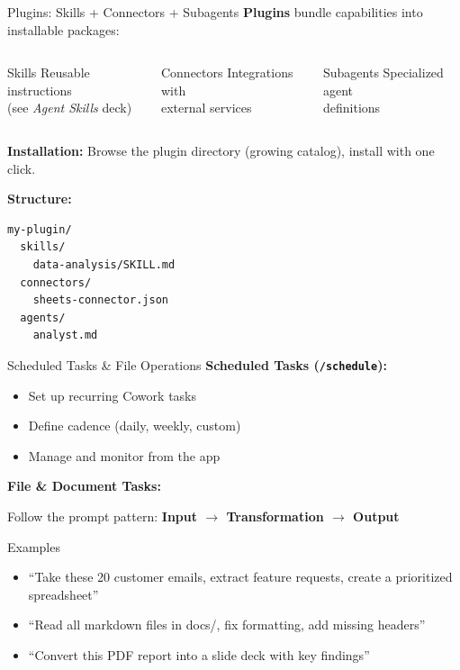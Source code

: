 \documentclass[aspectratio=169]{beamer}
\begin{document}
\begin{frame}[fragile]{Plugins: Skills + Connectors + Subagents}
\textbf{Plugins} bundle capabilities into installable packages:

\bigskip
\begin{columns}[T]
\begin{block}{Skills}
Reusable instructions\\(see \emph{Agent Skills} deck)
\end{block}

\begin{block}{Connectors}
Integrations with\\external services
\end{block}

\begin{block}{Subagents}
Specialized agent\\definitions
\end{block}
\end{columns}

\bigskip
\textbf{Installation:} Browse the plugin directory (growing catalog), install with one click.

\textbf{Structure:}
\begin{lstlisting}
my-plugin/
  skills/
    data-analysis/SKILL.md
  connectors/
    sheets-connector.json
  agents/
    analyst.md
\end{lstlisting}
\end{frame}

\begin{frame}{Scheduled Tasks \& File Operations}
\textbf{\color{popblue}Scheduled Tasks (\texttt{/schedule}):}
\begin{itemize}
  \item Set up recurring Cowork tasks
  \item Define cadence (daily, weekly, custom)
  \item Manage and monitor from the app
\end{itemize}

\bigskip
\textbf{\color{paramgreen}File \& Document Tasks:}

Follow the prompt pattern: \textbf{Input $\to$ Transformation $\to$ Output}

\begin{exampleblock}{Examples}
\begin{itemize}
  \item ``Take these 20 customer emails, extract feature requests, create a prioritized spreadsheet''
  \item ``Read all markdown files in docs/, fix formatting, add missing headers''
  \item ``Convert this PDF report into a slide deck with key findings''
\end{itemize}
\end{exampleblock}
\end{frame}
\end{document}
